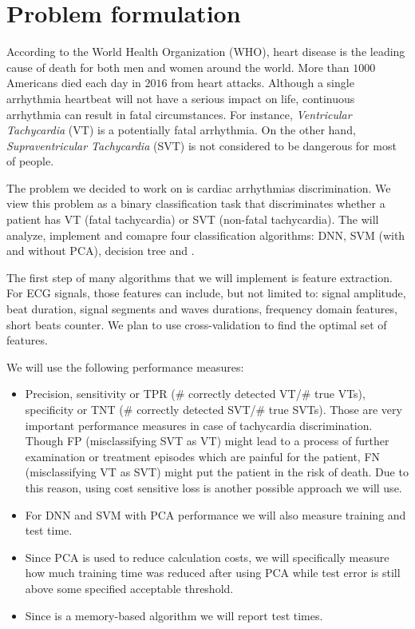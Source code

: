 \section{Problem  formulation}
\label{sec:problem}

According to the World Health Organization (WHO), heart disease is 
the leading cause of death for both men and women around the world.
More than $1000$ Americans died each day in $2016$ from heart 
attacks. 
Although a single arrhythmia heartbeat will not have a serious impact 
on life, continuous arrhythmia can result in fatal circumstances.
For instance, \textit{Ventricular Tachycardia} (VT) is a potentially 
fatal arrhythmia. 
On the other hand, \textit{Supraventricular Tachycardia} (SVT)
is not considered to be dangerous for most of people. 

The problem we decided to work on is cardiac arrhythmias 
discrimination. We view this problem as a binary classification task 
that discriminates whether a patient has VT (fatal tachycardia) or  
SVT (non-fatal tachycardia). The will analyze, implement and comapre 
four classification algorithms: DNN, SVM (with and without 
PCA), 
decision tree and \knn.


The first step of many algorithms that we will implement is feature 
extraction. For ECG signals, those features can include, but not 
limited to: signal amplitude, beat duration, signal segments and 
waves durations, frequency domain features, short beats counter. 
We plan to use cross-validation to find the optimal set of features.

We will use the following performance measures:
\begin{itemize}
	\item Precision, sensitivity or TPR ($\#$ correctly detected 
	VT/$\#$ true 
	VTs), specificity or TNT ($\#$ correctly detected SVT/$\#$ true 
	SVTs). Those are very important performance measures in case of 
	tachycardia discrimination. Though FP (misclassifying SVT as VT) 
	might lead 
	to a 
	process of further examination or treatment episodes which are 
	painful for the patient, FN (misclassifying VT as SVT) might put 
	the patient in the risk of death.  
	Due to this reason, using cost sensitive loss is another possible 
	approach we will use.
	\item For DNN and SVM with PCA performance we will also measure 
	training 
	and test time.
	\item Since PCA is used to reduce calculation costs, we will 
	specifically 
	measure how much training time was reduced after using PCA while 
	test error is still above some specified acceptable threshold. 
	\item Since \knn is a memory-based algorithm we will report 
	test times. 
\end{itemize}


